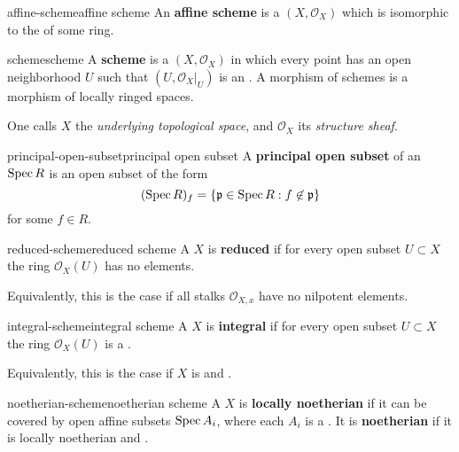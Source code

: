 \begin{topic}{affine-scheme}{affine scheme}
    An \textbf{affine scheme} is a  $(X, \mathcal{O}_X)$ which is isomorphic to the  of some ring.
\end{topic}

\begin{topic}{scheme}{scheme}
    A \textbf{scheme} is a  $(X, \mathcal{O}_X)$ in which every point has an open neighborhood $U$ such that $(U, \mathcal{O}_X|_U)$ is an . A morphism of schemes is a morphism of locally ringed spaces.
    
    One calls $X$ the \textit{underlying topological space}, and $\mathcal{O}_X$ its \textit{structure sheaf}.
\end{topic}

\begin{topic}{principal-open-subset}{principal open subset}
    A \textbf{principal open subset} of an  $\operatorname{Spec} R$ is an open subset of the form
    \[ (\operatorname{Spec} R)_f = \{ \mathfrak{p} \in \operatorname{Spec} R : f \not\in \mathfrak{p} \} \]
    for some $f \in R$.
\end{topic}

\begin{topic}{reduced-scheme}{reduced scheme}
    A  $X$ is \textbf{reduced} if for every open subset $U \subset X$ the ring $\mathcal{O}_X(U)$ has no  elements.
    
    Equivalently, this is the case if all stalks $\mathcal{O}_{X, x}$ have no nilpotent elements.
\end{topic}

\begin{topic}{integral-scheme}{integral scheme}
    A  $X$ is \textbf{integral} if for every open subset $U \subset X$ the ring $\mathcal{O}_X(U)$ is a .
    
    Equivalently, this is the case if $X$ is  and .
\end{topic}

\begin{topic}{noetherian-scheme}{noetherian scheme}
    A  $X$ is \textbf{locally noetherian} if it can be covered by open affine subsets $\operatorname{Spec} A_i$, where each $A_i$ is a . It is \textbf{noetherian} if it is locally noetherian and .
\end{topic}

